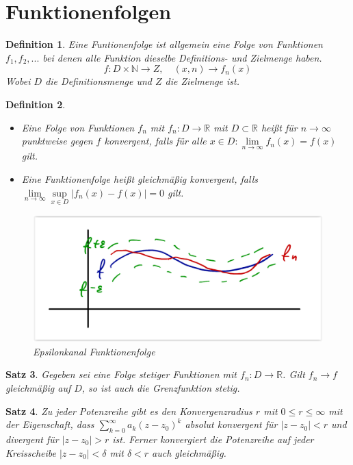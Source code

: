 \documentclass[12pt,a4paper]{report}%
\newtheorem{satz}{Satz}[section]
\newtheorem{definition}[satz]{Definition}
\numberwithin{equation}{section}
\newcommand{\R}{\mathbb{R}} %
\newcommand{\N}{\mathbb{N}}
\numberwithin{equation}{subsection}
\begin{document}
\section{Funktionenfolgen}
\begin{definition}
  Eine Funtionenfolge ist allgemein eine Folge von Funktionen $f_1, f_2, ...$ bei denen alle Funktion dieselbe Definitions- und Zielmenge haben.
  \begin{equation}
  f:D\times \N \rightarrow Z, \quad (x,n) \rightarrow f_n(x)
  \end{equation}
  Wobei $D$ die Definitionsmenge und $Z$ die Zielmenge ist.
\end{definition}
\begin{definition}
  \begin{itemize}
    \item[a )] Eine Folge von Funktionen $f_n$ mit $f_n: D \rightarrow \R$ mit $D \subset \R$ heißt für $n \rightarrow \infty$ punktweise gegen $f$ konvergent, falls für alle $x \in D: \lim\limits_{n \rightarrow \infty} f_n(x) = f(x)$ gilt.
    \item[b )] Eine Funktionenfolge heißt gleichmäßig konvergent, falls \newline $\lim\limits_{n \rightarrow \infty} \sup\limits_{x \in D} |f_n(x) -f(x)| = 0$ gilt.
  \end{itemize}
  \begin{figure}[H] 
		\centering
	  \centering
	  \captionsetup{justification=centering}
	  \includegraphics[width=0.5\linewidth]{funktionenfolgen_konvergenz.png}
	  \caption{Epsilonkanal Funktionenfolge \protect\cite{HM12}}
	  \label{fig:funktionenfolge_konvergenz}
  \end{figure}
\end{definition}
\begin{satz}
  Gegeben sei eine Folge stetiger Funktionen mit $f_n: D\rightarrow \R$. Gilt $f_n \rightarrow f$ gleichmäßig auf $D$, so ist auch die Grenzfunktion stetig.
\end{satz}
\begin{satz}
  Zu jeder Potenzreihe gibt es den Konvergenzradius $r$ mit $0 \leq r \leq \infty$ mit der Eigenschaft, dass $\sum\limits_{k=0}^\infty a_k(z-z_0)^k$ absolut konvergent für $|z-z_0| < r$ und divergent für $|z-z_0|>r$ ist.\newline
  Ferner konvergiert die Potenzreihe auf jeder Kreisscheibe $|z-z_0| < \delta$ mit $\delta < r$ auch gleichmäßig. 
\end{satz}
\end{document}
